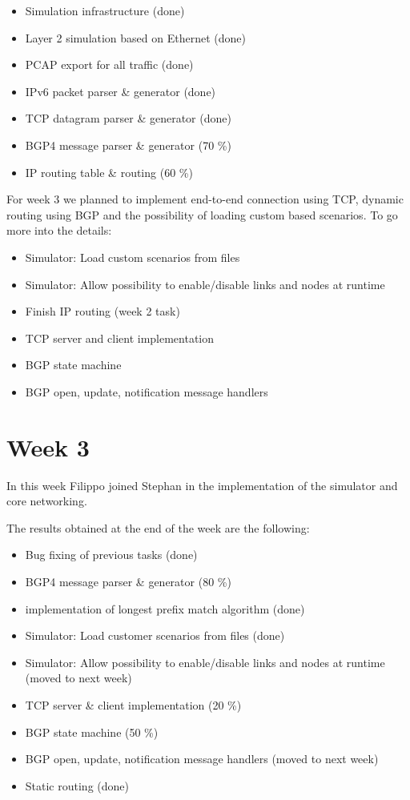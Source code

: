 \begin{itemize}
 \item Simulation infrastructure (done)
 \item Layer 2 simulation based on Ethernet (done)
 \item PCAP export for all traffic (done)
 \item IPv6 packet parser \& generator (done)
 \item TCP datagram parser \& generator (done)
 \item BGP4 message parser \& generator (70 \%)
 \item IP routing table \& routing (60 \%)
\end{itemize}

For week 3 we planned to implement end-to-end connection using TCP, dynamic routing using BGP and the possibility of loading custom based scenarios.
To go more into the details:

\begin{itemize}
 \item Simulator: Load custom scenarios from files
 \item Simulator: Allow possibility to enable/disable links and nodes at runtime
 \item Finish IP routing (week 2 task)
 \item TCP server and client implementation
 \item BGP state machine
 \item BGP open, update, notification message handlers
\end{itemize}

\section{Week 3}
In this week Filippo joined Stephan in the implementation of the simulator and core networking.

The results obtained at the end of the week are the following:

\begin{itemize}
 \item Bug fixing of previous tasks (done)
 \item BGP4 message parser \& generator (80 \%)
 \item implementation of longest prefix match algorithm (done)
 \item Simulator: Load customer scenarios from files (done)
 \item Simulator: Allow possibility to enable/disable links and nodes at runtime (moved to next week)
 \item TCP server \& client implementation (20 \%)
 \item BGP state machine (50 \%)
 \item BGP open, update, notification message handlers (moved to next week)
 \item Static routing (done)
\end{itemize}

